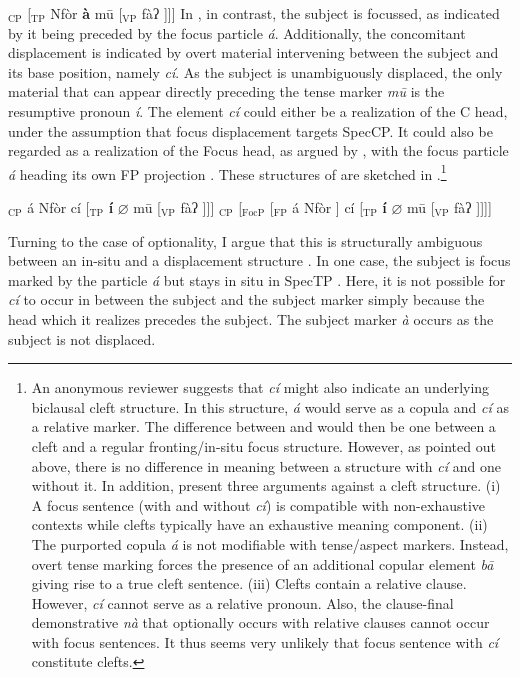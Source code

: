 \documentclass[output=paper]{langscibook}
\begin{document}
\ea {[}$_{\text{CP}}$ [$_{\text{TP}}$ Nfòr \textbf{à} mū [$_{\text{VP}}$ fàʔ ]]]\label{ex:johanneshein:structurenofocus}
\z
In , in contrast, the subject is focussed, as indicated by
it being preceded by the focus particle \textit{á}. Additionally,
the concomitant displacement is indicated by overt material intervening between the
subject and its base position, namely \textit{cí}. As the subject
is unambiguously displaced, the only material that can
appear directly preceding the tense marker \textit{mū} is the
resumptive pronoun \textit{í}. The element \textit{cí} could
either be a realization of the C head, under the assumption that focus
displacement targets SpecCP. It could also be regarded as a realization of
the Focus head, as argued by \citet{beckeretal19}, with the focus
particle \textit{á} heading its own FP projection \citep[see
also][]{horvath07,horvath10,horvath13,cable10}. These structures of
 are sketched in .\footnote{An anonymous reviewer suggests that \textit{cí} might also indicate an underlying biclausal cleft structure. In this structure, \textit{á} would serve as a copula and \textit{cí} as a relative marker. The difference between  and  would then be one between a cleft and a regular fronting/in-situ focus structure. However, as pointed out above, there is no difference in meaning between a structure with \textit{cí} and one without it. In addition, \citet[][§3.1]{beckeretal19} present three arguments against a cleft structure. (i) A focus sentence (with and without \textit{cí}) is compatible with non-exhaustive contexts while clefts typically have an exhaustive meaning component. (ii) The purported copula \textit{á} is not modifiable with tense/aspect markers. Instead, overt tense marking forces the presence of an additional copular element \textit{bā} giving rise to a true cleft sentence. (iii) Clefts contain a relative clause. However, \textit{cí} cannot serve as a relative pronoun. Also, the clause-final demonstrative \textit{nà} that optionally occurs with relative clauses cannot occur with focus sentences. It thus seems very unlikely that focus sentence with \textit{cí} constitute clefts.}

\ea \label{ex:johanneshein:structureexsitufocus}
\begin{xlist}
\ex {[}$_{\text{CP}}$ á Nfòr cí [$_{\text{TP}}$ \textbf{í}
$\varnothing$ mū [$_{\text{VP}}$ fàʔ ]]]
\ex {[}$_{\text{CP}}$ [$_{\text{FocP}}$ [$_{\text{FP}}$ á Nfòr ] cí [$_{\text{TP}}$ \textbf{í}
$\varnothing$ mū [$_{\text{VP}}$ fàʔ ]]]]
\end{xlist}
\z
Turning to the case of optionality, I argue that this is structurally
ambiguous between an in-situ  and a displacement structure . In
one case, the subject is focus marked by the particle \textit{á} but
stays in situ in SpecTP . Here, it is not possible for
\textit{cí} to occur in between the subject and the subject marker
simply because the head which it realizes precedes the subject. The
subject marker \textit{à} occurs as the subject is not displaced.
\end{document}
